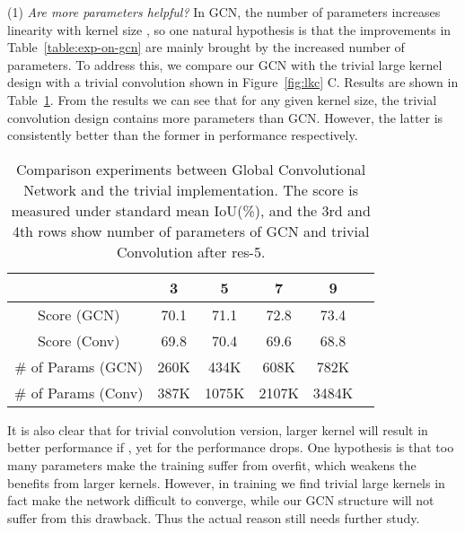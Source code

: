 \documentclass[10pt,twocolumn,letterpaper]{article}
\begin{document}
\par
	(1) \emph{Are more parameters helpful?} In GCN, the number of parameters increases linearity with kernel size , so one natural hypothesis is that the improvements in Table~\ref{table:exp-on-gcn} are mainly brought by the increased number of parameters. To address this, we compare our GCN with the trivial large kernel design with a trivial  convolution shown in Figure~\ref{fig:lkc} C. Results are shown in Table~\ref{table:exp-on-naive}. From the results we can see that for any given kernel size, the trivial convolution design contains more parameters than GCN. However, the latter is consistently better than the former in performance respectively.  
   \begin{table}[h]
      \begin{center}
         \begin{tabular}{|c|c|c|c|c|c|}
            \hline
             & 3 & 5 & 7 & 9\\
            \hline
            Score (GCN) & 70.1 & 71.1 & 72.8 & 73.4 \\
            \hline
            Score (Conv) & 69.8 & 70.4 & 69.6 & 68.8 \\
            \hline 
            \# of Params (GCN) & 260K & 434K & 608K & 782K \\
            \hline
            \# of Params (Conv) & 387K & 1075K & 2107K & 3484K \\
            \hline
         \end{tabular}
      \end{center}
      \caption{Comparison experiments between Global Convolutional Network and the trivial implementation. The score is measured under standard mean IoU(\%), and the 3rd and 4th rows show number of parameters of GCN and trivial Convolution after res-5.}
      \label{table:exp-on-naive}
   \end{table}
	It is also clear that for trivial convolution version, larger kernel will result in better performance if , yet for  the performance drops. One hypothesis is that too many parameters make the training suffer from overfit, which weakens the benefits from larger kernels. However, in training we find trivial large kernels in fact make the network difficult to converge, while our GCN structure will not suffer from this drawback. Thus the actual reason still needs further study.
\end{document}
